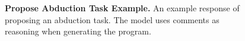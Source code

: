 \documentclass{article}
\begin{document}
\begin{figure}



    \caption{\textbf{Propose Abduction Task Example.} An example response of proposing an abduction task. The model uses comments as reasoning when generating the program.}
    \label{fig:gen_code_i_matrix_example}
\end{figure}
\end{document}
